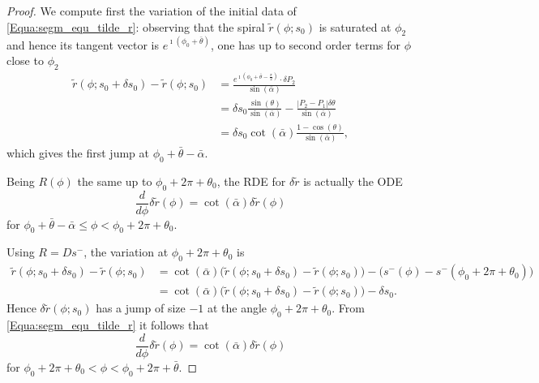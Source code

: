\documentclass[reqno]{amsart}
\theoremstyle{definition} \newtheorem{definition}{Definition}[section]
\theoremstyle{definition} \newtheorem{remark}[definition]{Remark}
\theoremstyle{plain} \newtheorem{lemma}[definition]{Lemma}
\theoremstyle{plain} \newtheorem{proposition}[definition]{Proposition}
\theoremstyle{plain} \newtheorem{theorem}[definition]{Theorem}
\theoremstyle{plain} \newtheorem{corollary}[definition]{Corollary}
\theoremstyle{definition} \newtheorem{example}[definition]{Example}
\theoremstyle{plain} \newtheorem{claim}[clai]{Claim}
\theoremstyle{definition} \newtheorem{assumption}[definition]{Assumption}
\theoremstyle{definition} \newtheorem{observation}[definition]{Observation}
\newcommand{\1}{\mathbbm 1}
\renewcommand{\i}{\imath}
\numberwithin{equation}{section} %
\theoremstyle{plain} \newtheorem*{theorem*}{Theorem}
\theoremstyle{plain} \newtheorem{mthm}[maintheorem]{Main Theorem}
\theoremstyle{plain} \newtheorem*{mthm*}{Main Theorem}
\theoremstyle{plain} \newtheorem*{conjecture*}{Conjecture}
\theoremstyle{plain} \newtheorem{conjecture}[definition]{Conjecture}
\theoremstyle{plain} \newtheorem*{problem*}{Problem}
\begin{document}
\begin{proof}
%
We compute first the variation of the initial data of \eqref{Equa:segm_equ_tilde_r}: observing that the spiral $\tilde r(\phi;s_0)$ is saturated at $\phi_2$ and hence its tangent vector is $e^{\i (\phi_0 + \bar \theta)}$, one has up to second order terms for $\phi$ close to $\phi_2$ 
\begin{align*}
\tilde r(\phi;s_0 + \delta s_0) - \tilde r(\phi;s_0) &= \frac{e^{\i (\phi_0 + \bar \theta - \frac{\pi}{2})} \cdot \delta P_2}{\sin(\bar \alpha)} \\
&= \delta s_0 \frac{\sin(\theta)}{\sin(\bar \alpha)} - \frac{|P_2 - P_1| \delta \theta}{\sin(\bar \alpha)} \\
&= \delta s_0 \cot(\bar \alpha) \frac{1 - \cos(\theta)}{\sin(\bar \alpha)},
\end{align*}
which gives the first jump at $\phi_0 + \bar \theta - \bar \alpha$.

Being $R(\phi)$ the same up to $\phi_0 + 2\pi + \theta_0$, the RDE for $\delta \tilde r$ is actually the ODE
\begin{equation*}
\frac{d}{d\phi} \delta \tilde r(\phi) = \cot(\bar \alpha) \delta \tilde r(\phi)
\end{equation*}
for $\phi_0 + \bar \theta - \bar\alpha \leq \phi < \phi_0 + 2\pi + \theta_0$.

Using $R = Ds^-$, the variation at $\phi_0 + 2\pi + \theta_0$ is
\begin{align*}
\tilde r(\phi;s_0 + \delta s_0) - \tilde r(\phi;s_0) &= \cot(\bar \alpha) \big( \tilde r(\phi;s_0 + \delta s_0) - \tilde r(\phi;s_0) \big) - \big( s^-(\phi) - s^-(\phi_0 + 2\pi + \theta_0) \big) \\
&= \cot(\bar \alpha) \big( \tilde r(\phi;s_0 + \delta s_0) - \tilde r(\phi;s_0) \big) - \delta s_0.
\end{align*}
Hence $\delta \tilde r(\phi;s_0)$ has a jump of size $-1$ at the angle $\phi_0 + 2\pi + \theta_0$. %
%
From \eqref{Equa:segm_equ_tilde_r} it follows that
\begin{equation*}
\frac{d}{d\phi} \delta \tilde r(\phi) = \cot(\bar \alpha) \delta \tilde r(\phi)
\end{equation*}
for $\phi_0 + 2\pi + \theta_0 < \phi < \phi_0 + 2\pi + \bar \theta$.


\end{proof}
\end{document}
